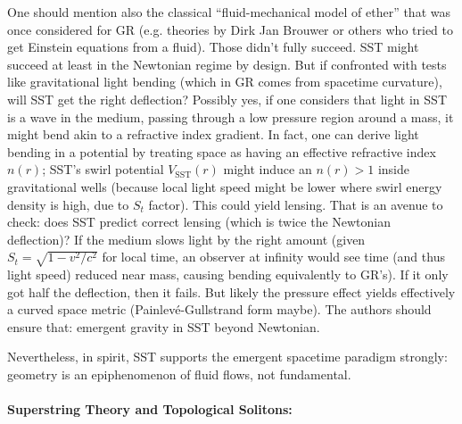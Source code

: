 \documentclass[10pt,reprint,aps,onecolumn,nofootinbib]{revtex4-2}
\begin{document}
One should mention also the classical “fluid-mechanical model of ether” that was once considered for GR (e.g. theories by Dirk Jan Brouwer or others who tried to get Einstein equations from a fluid). Those didn’t fully succeed. SST might succeed at least in the Newtonian regime by design. But if confronted with tests like gravitational light bending (which in GR comes from spacetime curvature), will SST get the right deflection? Possibly yes, if one considers that light in SST is a wave in the medium, passing through a low pressure region around a mass, it might bend akin to a refractive index gradient. In fact, one can derive light bending in a potential by treating space as having an effective refractive index $n(r)$; SST’s swirl potential $V_{\text{SST}}(r)$ might induce an $n(r) > 1$ inside gravitational wells (because local light speed might be lower where swirl energy density is high, due to $S_t$ factor). This could yield lensing. That is an avenue to check: does SST predict correct lensing (which is twice the Newtonian deflection)? If the medium slows light by the right amount (given $S_t = \sqrt{1- v^2/c^2}$ for local time, an observer at infinity would see time (and thus light speed) reduced near mass, causing bending equivalently to GR’s). If it only got half the deflection, then it fails. But likely the pressure effect yields effectively a curved space metric (Painlevé-Gullstrand form maybe). The authors should ensure that: emergent gravity in SST beyond Newtonian.


Nevertheless, in spirit, SST supports the emergent spacetime paradigm strongly: geometry is an epiphenomenon of fluid flows, not fundamental.


\paragraph{Superstring Theory and Topological Solitons:}
\end{document}
